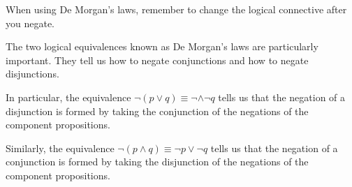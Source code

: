 \begin{tcolorbox}[colback=white, colframe=gray!60, title=Remark 1]
When using De
Morgan’s laws,
remember to change
the logical connective
after you negate.
\end{tcolorbox}
\begin{tcolorbox}[colback=white, colframe=gray!60, title=Remark 2]
The two logical equivalences known as De Morgan’s laws are particularly important. They tell
us how to negate conjunctions and how to negate disjunctions.
\end{tcolorbox}
\begin{tcolorbox}[colback=white, colframe=gray!60, title=Remark 3]
In particular, the equivalence $\neg (p \lor q) \equiv \neg \land \neg q$ tells us that the negation of a disjunction is formed by taking the conjunction
of the negations of the component propositions.
\end{tcolorbox}
\begin{tcolorbox}[colback=white, colframe=gray!60, title=Remark 4]
Similarly, the equivalence $\neg (p \land q) \equiv \neg p \lor \neg q $
tells us that the negation of a conjunction is formed by taking the disjunction of the negations
of the component propositions.
\end{tcolorbox}

